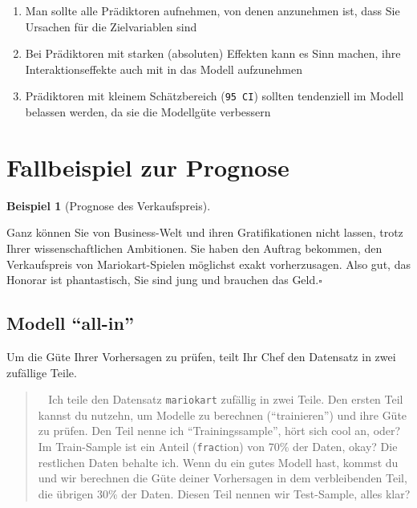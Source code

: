\documentclass[
  a4paper,
]{scrbook}
\providecommand{\tightlist}{%
  \setlength{\itemsep}{0pt}\setlength{\parskip}{0pt}}\usepackage{longtable,booktabs,array}
\theoremstyle{definition}
\newtheorem{example}{Beispiel}[chapter]
\theoremstyle{definition}
\theoremstyle{definition}
\theoremstyle{remark}
\begin{document}
\begin{enumerate}
\def\labelenumi{\arabic{enumi}.}
\tightlist
\item
  Man sollte alle Prädiktoren aufnehmen, von denen anzunehmen ist, dass
  Sie Ursachen für die Zielvariablen sind
\item
  Bei Prädiktoren mit starken (absoluten) Effekten kann es Sinn machen,
  ihre Interaktionseffekte auch mit in das Modell aufzunehmen
\item
  Prädiktoren mit kleinem Schätzbereich (\texttt{95\ CI}) sollten
  tendenziell im Modell belassen werden, da sie die Modellgüte
  verbessern
\end{enumerate}

\section{Fallbeispiel zur Prognose}\label{fallbeispiel-zur-prognose}

\begin{example}[Prognose des
Verkaufspreis]\protect\hypertarget{exm-prognose}{}\label{exm-prognose}

Ganz können Sie von Business-Welt und ihren Gratifikationen nicht
lassen, trotz Ihrer wissenschaftlichen Ambitionen. Sie haben den Auftrag
bekommen, den Verkaufspreis von Mariokart-Spielen möglichst exakt
vorherzusagen. Also gut, das Honorar ist phantastisch, Sie sind jung und
brauchen das Geld.\(\square\)

\end{example}

\subsection{Modell ``all-in''}\label{modell-all-in}

Um die Güte Ihrer Vorhersagen zu prüfen, teilt Ihr Chef den Datensatz in
zwei zufällige Teile.

\begin{quote}
🧔‍♂️ Ich teile den Datensatz \texttt{mariokart} zufällig in zwei Teile.
Den ersten Teil kannst du nutzehn, um Modelle zu berechnen
(``trainieren'') und ihre Güte zu prüfen. Den Teil nenne ich
``Trainingssample'', hört sich cool an, oder? Im Train-Sample ist ein
Anteil (\texttt{frac}tion) von 70\% der Daten, okay? Die restlichen
Daten behalte ich. Wenn du ein gutes Modell hast, kommst du und wir
berechnen die Güte deiner Vorhersagen in dem verbleibenden Teil, die
übrigen 30\% der Daten. Diesen Teil nennen wir Test-Sample, alles klar?
\end{quote}
\end{document}

